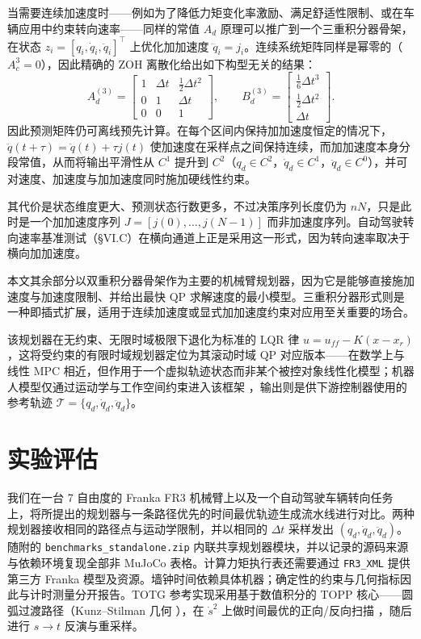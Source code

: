 当需要连续加速度时——例如为了降低力矩变化率激励、满足舒适性限制、或在车辆应用中约束转向速率——同样的常值 \(A_d\) 原理可以推广到一个三重积分器骨架，在状态 \(z_i=[q_i,\dot q_i,\ddot q_i]^\top\) 上优化加加速度 \(\dddot q_i = j_i\)。连续系统矩阵同样是幂零的（\(A_c^3=0\)），因此精确的 ZOH 离散化给出如下构型无关的结果：
\begin{equation}
\label{eq:triple-zoh}
A_d^{(3)} =
\begin{bmatrix}
1&\Delta t&\tfrac{1}{2}\Delta t^2\\
0&1&\Delta t\\
0&0&1
\end{bmatrix},
\qquad
B_d^{(3)} =
\begin{bmatrix}
\tfrac{1}{6}\Delta t^3\\
\tfrac{1}{2}\Delta t^2\\
\Delta t
\end{bmatrix}.
\end{equation}
因此预测矩阵仍可离线预先计算。在每个区间内保持加加速度恒定的情况下，\(\ddot q(t+\tau)=\ddot q(t)+\tau j(t)\) 使加速度在采样点之间保持连续，而加加速度本身分段常值，从而将输出平滑性从 \(C^1\) 提升到 \(C^2\)（\(q_d\in C^2\)，\(\dot q_d\in C^1\)，\(\ddot q_d\in C^0\)），并可对速度、加速度与加加速度同时施加硬线性约束。

其代价是状态维度更大、预测状态行数更多，不过决策序列长度仍为 \(nN\)，只是此时是一个加加速度序列 \(J=[j(0),\dots,j(N-1)]\) 而非加速度序列。自动驾驶转向速率基准测试（§VI.C）在横向通道上正是采用这一形式，因为转向速率取决于横向加加速度。

本文其余部分以双重积分器骨架作为主要的机械臂规划器，因为它是能够直接施加速度与加速度限制、并给出最快 QP 求解速度的最小模型。三重积分器形式则是一种即插式扩展，适用于连续加速度或显式加加速度约束对应用至关重要的场合。

该规划器在无约束、无限时域极限下退化为标准的 LQR 律 \(u=u_{ff}-K(x-x_r)\)，这将受约束的有限时域规划器定位为其滚动时域 QP 对应版本——在数学上与线性 MPC \cite{mayne2000} 相近，但作用于一个虚拟轨迹状态而非某个被控对象线性化模型；机器人模型仅通过运动学与工作空间约束进入该框架 \cite{khatib1987}，输出则是供下游控制器使用的参考轨迹 \(\mathcal T=\{q_d,\dot q_d,\ddot q_d\}\)。

\section{实验评估}\label{vi.-experimental-evaluation}

我们在一台 7 自由度的 Franka FR3 机械臂上以及一个自动驾驶车辆转向任务上，将所提出的规划器与一条路径优先的时间最优轨迹生成流水线进行对比。两种规划器接收相同的路径点与运动学限制，并以相同的 \(\Delta t\) 采样发出 \((q_d, \dot q_d, \ddot q_d)\)。随附的 \texttt{benchmarks\_standalone.zip} 内联共享规划器模块，并以记录的源码来源与依赖环境复现全部非 MuJoCo 表格。计算力矩执行表还需要通过 \texttt{FR3\_XML} 提供第三方 Franka 模型及资源。墙钟时间依赖具体机器；确定性的约束与几何指标因此与计时测量分开报告。TOTG 参考实现采用基于数值积分的 TOPP 核心——圆弧过渡路径（Kunz--Stilman 几何 \cite{kunz2012}），在 \(\dot s^2\) 上做时间最优的正向/反向扫描 \cite{toppra}，随后进行 \(s\!\to\!t\) 反演与重采样。

